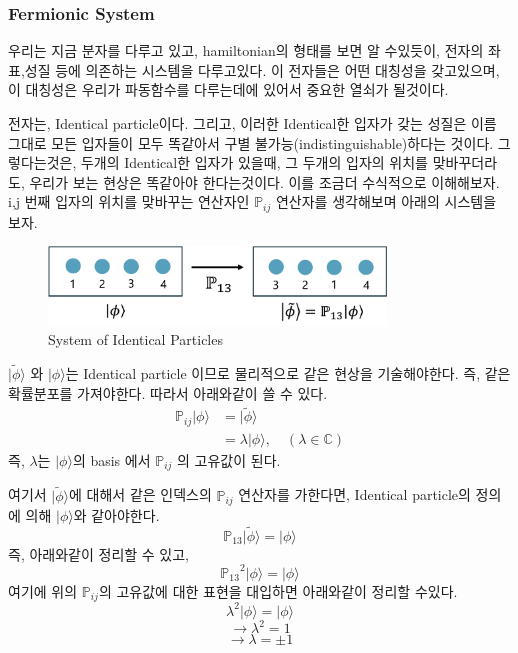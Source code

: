 \documentclass[10pt]{article}
\begin{document}
\subsubsection{Fermionic System}
우리는 지금 분자를 다루고 있고, hamiltonian의 형태를 보면 알 수있듯이, 전자의 좌표,성질 등에 의존하는 시스템을 다루고있다. 이 전자들은 어떤 대칭성을 갖고있으며, 이 대칭성은 우리가 파동함수를 다루는데에 있어서 중요한 열쇠가 될것이다. 

전자는, Identical particle이다. 그리고, 이러한 Identical한 입자가 갖는 성질은 이름 그대로 모든 입자들이 모두 똑같아서 구별 불가능(indistinguishable)하다는 것이다. 
그렇다는것은, 두개의 Identical한 입자가 있을때, 그 두개의 입자의 위치를 맞바꾸더라도, 우리가 보는 현상은 똑같아야 한다는것이다. 
이를 조금더 수식적으로 이해해보자. i,j 번째 입자의 위치를 맞바꾸는 연산자인 \(\mathbb{P}_{ij}\) 연산자를 생각해보며 아래의 시스템을 보자. 

\begin{figure}[htbp]
  \centering
  \includegraphics[width=0.8\textwidth]{fig/ident.png}
  \caption{System of Identical Particles}
  \label{fig:example2}
\end{figure}
\(\vert \tilde{\phi} \rangle\) 와 \(\vert \phi \rangle\)는 Identical particle 이므로 물리적으로 같은 현상을 기술해야한다. 즉, 같은 확률분포를 가져야한다. 따라서 아래와같이 쓸 수 있다. 
\begin{align*}
\mathbb{P}_{ij}\vert \phi \rangle &= \vert \tilde{\phi} \rangle \\
&= \lambda \vert \phi \rangle,\quad (\lambda \in \mathbb{C})
\end{align*}
즉, \(\lambda\)는 \(\vert \phi \rangle\)의 basis 에서 \(\mathbb{P}_{ij}\)  의 고유값이 된다. 

여기서 \(\vert \tilde{\phi} \rangle\)에 대해서 같은 인덱스의 \(\mathbb{P}_{ij}\) 연산자를 가한다면, Identical particle의 정의에 의해 \(\vert \phi \rangle\)와 같아야한다. 
\[
\mathbb{P}_{13} \vert \tilde{\phi} \rangle = \vert \phi \rangle
\]
즉, 아래와같이 정리할 수 있고, 
\[
{\mathbb{P}_{13}}^2 \vert \phi \rangle = \vert \phi \rangle
\]
여기에 위의 \(\mathbb{P}_{ij}\)의 고유값에 대한 표현을 대입하면 아래와같이 정리할 수있다. 
\[
{\lambda}^2 \vert \phi \rangle = \vert \phi \rangle
\]
\[
\longrightarrow {\lambda}^2 = 1
\]
\[
\longrightarrow \lambda = \pm 1
\]
\end{document}
